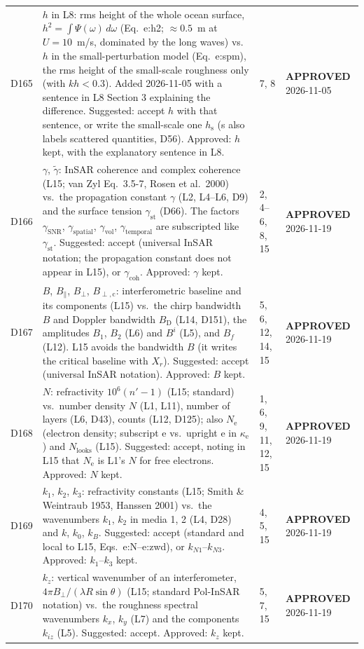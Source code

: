 \documentclass[11pt, oneside]{article}
\newcommand{\approved}{\textbf{APPROVED}}
\begin{document}
\begin{longtable}{l >{\raggedright\arraybackslash}p{} l l}
D165 & $h$ in L8: rms height of the whole ocean surface, $h^2 = \int\Psi(\omega)\,d\omega$ (Eq.~e:h2; $\approx 0.5$~m at $U = 10$~m/s, dominated by the long waves) vs.\ $h$ in the small-perturbation model (Eq.~e:spm), the rms height of the small-scale roughness only (with $kh < 0.3$). Added 2026-11-05 with a sentence in L8 Section 3 explaining the difference. Suggested: accept $h$ with that sentence, or write the small-scale one $h_\mathrm{s}$ (s also labels scattered quantities, D56). Approved: $h$ kept, with the explanatory sentence in L8. & 7, 8 & \approved{} 2026-11-05 \\
D166 & $\gamma$, $\tilde{\gamma}$: InSAR coherence and complex coherence (L15; van Zyl Eq.~3.5-7, Rosen et al.\ 2000) vs.\ the propagation constant $\gamma$ (L2, L4--L6, D9) and the surface tension $\gamma_\mathrm{st}$ (D66). The factors $\gamma_\mathrm{SNR}$, $\gamma_\mathrm{spatial}$, $\gamma_\mathrm{vol}$, $\gamma_\mathrm{temporal}$ are subscripted like $\gamma_\mathrm{st}$. Suggested: accept (universal InSAR notation; the propagation constant does not appear in L15), or $\gamma_\mathrm{coh}$. Approved: $\gamma$ kept. & 2, 4--6, 8, 15 & \approved{} 2026-11-19 \\
D167 & $B$, $B_\parallel$, $B_\perp$, $B_{\perp,\mathrm{c}}$: interferometric baseline and its components (L15) vs.\ the chirp bandwidth $B$ and Doppler bandwidth $B_\mathrm{D}$ (L14, D151), the amplitudes $B_1$, $B_2$ (L6) and $B^i$ (L5), and $B_f$ (L12). L15 avoids the bandwidth $B$ (it writes the critical baseline with $X_r$). Suggested: accept (universal InSAR notation). Approved: $B$ kept. & 5, 6, 12, 14, 15 & \approved{} 2026-11-19 \\
D168 & $N$: refractivity $10^6(n'-1)$ (L15; standard) vs.\ number density $N$ (L1, L11), number of layers (L6, D43), counts (L12, D125); also $N_\mathrm{e}$ (electron density; subscript e vs.\ upright e in $\kappa_\mathrm{e}$) and $N_\mathrm{looks}$ (L15). Suggested: accept, noting in L15 that $N_\mathrm{e}$ is L1's $N$ for free electrons. Approved: $N$ kept. & 1, 6, 9, 11, 12, 15 & \approved{} 2026-11-19 \\
D169 & $k_1$, $k_2$, $k_3$: refractivity constants (L15; Smith \& Weintraub 1953, Hanssen 2001) vs.\ the wavenumbers $k_1$, $k_2$ in media 1, 2 (L4, D28) and $k$, $k_0$, $k_B$. Suggested: accept (standard and local to L15, Eqs.~e:N--e:zwd), or $k_{N1}$--$k_{N3}$. Approved: $k_1$--$k_3$ kept. & 4, 5, 15 & \approved{} 2026-11-19 \\
D170 & $k_z$: vertical wavenumber of an interferometer, $4\pi B_\perp/(\lambda R\sin\theta)$ (L15; standard Pol-InSAR notation) vs.\ the roughness spectral wavenumbers $k_x$, $k_y$ (L7) and the components $k_{iz}$ (L5). Suggested: accept. Approved: $k_z$ kept. & 5, 7, 15 & \approved{} 2026-11-19 \\

\end{longtable}
\end{document}
